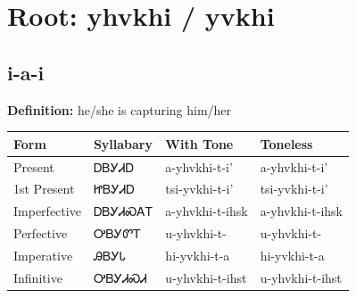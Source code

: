 \documentclass{article}%
\begin{document}
%
\normalsize%
\section*{Root: yhvkhi / yvkhi}%
\subsection*{i-a-i}%
\textbf{Definition: }%
he/she is capturing him/her%
\\[0.5em]%
\begin{tabular}{|l|l|l|l|}%
\hline%
\textbf{Form}&\textbf{Syllabary}&\textbf{With Tone}&\textbf{Toneless}\\%
\hline%
Present&ᎠᏴᎩᏗᎠ&a{-}yhvkhi{-}t{-}i'&a{-}yhvkhi{-}t{-}i'\\%
1st Present&ᏥᏴᎩᏗᎠ&tsi{-}yvkhi{-}t{-}i'&tsi{-}yvkhi{-}t{-}i'\\%
Imperfective&ᎠᏴᎩᏗᏍᎪᎢ&a{-}yhvkhi{-}t{-}ihsk&a{-}yhvkhi{-}t{-}ihsk\\%
Perfective&ᎤᏴᎩᏛᎢ&u{-}yhvkhi{-}t{-}&u{-}yhvkhi{-}t{-}\\%
Imperative&ᎯᏴᎩᏓ&hi{-}yvkhi{-}t{-}a&hi{-}yvkhi{-}t{-}a\\%
Infinitive&ᎤᏴᎩᏗᏍᏗ&u{-}yhvkhi{-}t{-}ihst&u{-}yhvkhi{-}t{-}ihst\\%
\hline%
\end{tabular}%
\\[1em]%
\end{document}
